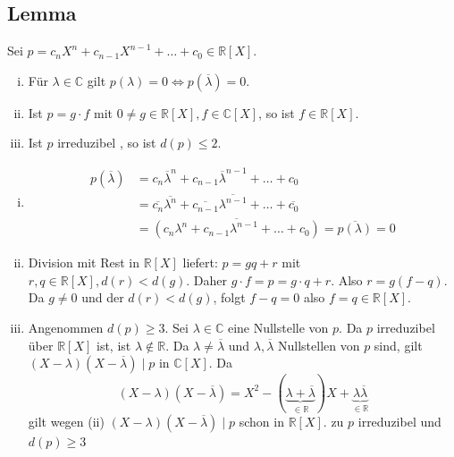 \subsection[Lemma  über Eigenschaften reeller Polynome]{Lemma} %
\label{sub:11.1}
Sei $p=c_n X^n + c_{n-1} X^{n-1} + \ldots  + c_0  \in \mathds{R}[X]$.
\begin{enumerate}[(i)]
	\item Für $\lambda \in \mathds{C}$ gilt $p(\lambda ) = 0 \iff p(\overline{\lambda})= 0$.
	\item Ist $p=g \cdot f$ mit $0 \not= g \in \mathds{R}[X], f \in \mathds{C}[X]$, so ist $f \in \mathds{R}[X]$.
	\item Ist $p$ irreduzibel , so ist $d(p) \le 2$.
\end{enumerate}
\begin{enumerate}[(i)]
	\item \begin{align*}
		p(\overline{\lambda}) &= c_n \overline{\lambda }^n + c_{n-1} \overline{\lambda }^{n-1} + \ldots + c_0 \\
		&= \overline{c_n} \overline{\lambda^n} + \overline{c_{n-1}} \overline{\lambda^{n-1}} + \ldots + \overline{c_0} \\
		&= \overline{(c_n \lambda^n + c_{n-1} \lambda ^{n-1} + \ldots + c_0)} = \overline{p(\lambda )} = 0       
	\end{align*}
	\item Division mit Rest in $\mathds{R}[X]$ liefert: $p=g q +r$ mit $r,q \in \mathds{R}[X], d(r) < d(g)$. Daher $g\cdot  f = p = g \cdot q + r$. Also 
	$r= g(f-q)$. Da $g \not= 0$ und der $d(r)< d(g)$, folgt $f-q = 0$ also $f=q \in \mathds{R}[X]$. 
	\item Angenommen $d(p) \ge 3$. Sei $\lambda \in \mathds{C}$ eine Nullstelle von $p$. Da $p$ irreduzibel über $\mathds{R}[X]$ ist, ist $\lambda \not\in \mathds{R}$.
	Da $\lambda \not= \overline{\lambda}$ und $\lambda , \overline{\lambda } $ Nullstellen von $p$ sind, gilt $(X-\lambda ) ( X- \overline{\lambda } ) \mid p$ in 
	$\mathds{C}[X]$. Da 
	\[
		(X-\lambda )(X- \overline{\lambda } ) = X^2 - (\underbrace{\lambda + \overline{\lambda}}_{\in \mathds{R}}) X + \underbrace{\lambda \overline{\lambda } }_{\in \mathds{R}}
	\]
	gilt wegen (ii) $(X-\lambda )(X- \overline{\lambda}) \mid p$ schon in $\mathds{R}[X]$. \light zu $p$ irreduzibel und $d(p)\ge 3$ \bewende
\end{enumerate}

